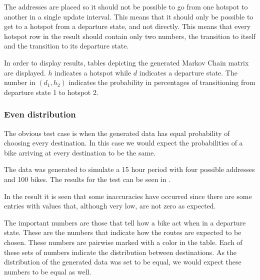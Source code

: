 The addresses are placed so it should not be possible to go from one hotspot to another in a single update interval.
This means that it should only be possible to get to a hotspot from a departure state, and not directly.
This means that every hotspot row in the result should contain only two numbers, the transition to itself and the transition to its departure state.

In order to display results, tables depicting the generated Markov Chain matrix are displayed.
$h$ indicates a hotspot while $d$ indicates a departure state.
The number in $ (d_1,h_2) $ indicates the probability in percentages of transitioning from departure state 1 to hotspot 2. 

\subsubsection{Even distribution}
The obvious test case is when the generated data has equal probability of choosing every destination. 
In this case we would expect the probabilities of a bike arriving at every destination to be the same.

The data was generated to simulate a 15 hour period with four possible addresses and 100 bikes.
The results for the test can be seen in .

In the result it is seen that some inaccuracies have occurred since there are some entries with values that, although very low, are not zero as expected.

The important numbers are those that tell how a bike act when in a departure state.
These are the numbers that indicate how the routes are expected to be chosen.
These numbers are pairwise marked with a color in the table.
Each of these sets of numbers indicate the distribution between destinations.
As the distribution of the generated data was set to be equal, we would expect these numbers to be equal as well.

